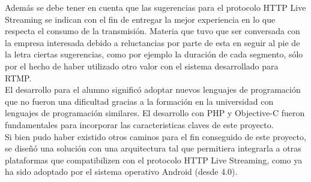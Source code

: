 Además se debe tener en cuenta que las sugerencias para el protocolo HTTP Live Streaming se indican con el fin de entregar la mejor experiencia en lo que respecta el consumo de la transmisión. Materia que tuvo que ser conversada con la empresa interesada debido a reluctancias por parte de esta en seguir al pie de la letra ciertas sugerencias, como por ejemplo la duración de cada segmento, sólo por el hecho de haber utilizado otro valor con el sistema desarrollado para RTMP.\\

El desarrollo para el alumno significó adoptar nuevos lenguajes de programación que no fueron una dificultad gracias a la formación en la universidad con lenguajes de programación similares. El desarrollo con PHP y Objective-C fueron fundamentales para incorporar las caracteristicas claves de este proyecto.\\

Si bien pudo haber existido otros caminos para el fin conseguido de este proyecto, se diseñó una solución con una arquitectura tal que permitiera integrarla a otras plataformas que compatibilizen con el protocolo HTTP Live Streaming, como ya ha sido adoptado por el sistema operativo Android (desde 4.0). \\



	
		
	

